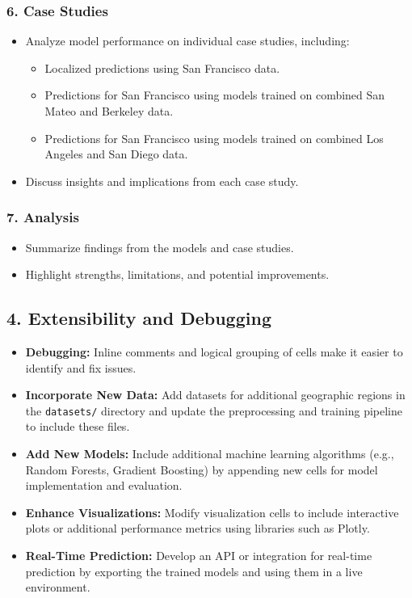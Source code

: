 \documentclass[10pt,twocolumn]{article}
\begin{document}
\begin{itemize}
\subsubsection*{6. Case Studies}
\begin{itemize}
    \item Analyze model performance on individual case studies, including:
    \begin{itemize}
        \item Localized predictions using San Francisco data.
        \item Predictions for San Francisco using models trained on combined San Mateo and Berkeley data.
        \item Predictions for San Francisco using models trained on combined Los Angeles and San Diego data.
    \end{itemize}
    \item Discuss insights and implications from each case study.
\end{itemize}

\subsubsection*{7. Analysis}
\begin{itemize}
    \item Summarize findings from the models and case studies.
    \item Highlight strengths, limitations, and potential improvements.
\end{itemize}



\subsection*{4. Extensibility and Debugging}
\begin{itemize}
    \item \textbf{Debugging:} Inline comments and logical grouping of cells make it easier to identify and fix issues.
    \item \textbf{Incorporate New Data:} Add datasets for additional geographic regions in the \texttt{datasets/} directory and update the preprocessing and training pipeline to include these files.
    \item \textbf{Add New Models:} Include additional machine learning algorithms (e.g., Random Forests, Gradient Boosting) by appending new cells for model implementation and evaluation.
    \item \textbf{Enhance Visualizations:} Modify visualization cells to include interactive plots or additional performance metrics using libraries such as Plotly.
    \item \textbf{Real-Time Prediction:} Develop an API or integration for real-time prediction by exporting the trained models and using them in a live environment.
\end{itemize}


\end{itemize}
\end{document}
